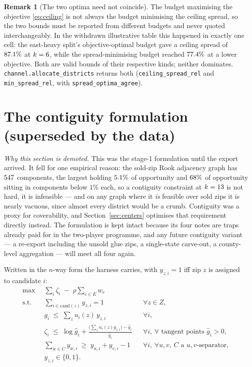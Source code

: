 \documentclass[11pt]{article}
\theoremstyle{definition}
\newtheorem{remark}{Remark}
\begin{document}
\begin{remark}[The two optima need not coincide]\label{rem:budget}
The budget maximising the objective \eqref{eq:ceiling} is not always the budget minimising
the ceiling spread, so the two bounds must be reported from different budgets and never
quoted interchangeably. In the withdrawn illustrative table this happened in exactly one
cell: the east-heavy split's objective-optimal budget gave a ceiling spread of
$87.1\%$ at $k=6$, while the spread-minimising budget reached
$77.4\%$ at a lower objective. Both are valid bounds of their respective
kinds; neither dominates. \texttt{channel.allocate\_districts} returns both
(\texttt{ceiling\_spread\_rel} and \texttt{min\_spread\_rel}, with
\texttt{spread\_optima\_agree}).
\end{remark}

\section{The contiguity formulation (superseded by the data)}\label{sec:formulation}

\emph{Why this section is demoted.} This was the stage-1 formulation until the export
arrived. It fell for one empirical reason: the sold-zip Rook adjacency graph has
$547$ components, the largest holding $5.1\%$ of opportunity
and $68\%$ of opportunity sitting in components below $1\%$ each, so a contiguity
constraint at $k=13$ is not hard, it is infeasible --- and on any graph where it
\emph{is} feasible over sold zips it is nearly vacuous, since almost every district would be
a crumb. Contiguity was a proxy for coverability, and Section~\ref{sec:centers} optimises
that requirement directly instead. The formulation is kept intact because its four notes are
traps already paid for in the two-player programme, and any future contiguity variant --- a
re-export including the unsold glue zips, a single-state carve-out, a county-level
aggregation --- will meet all four again.

Written in the $n$-way form the harness carries, with $y_{z,i}=1$ iff zip $z$ is
assigned to candidate $i$:
\begin{equation}\label{eq:milp}
\begin{aligned}
\max\;\; & \sum_i \zeta_i \;-\; \rho \sum_{e\in E} w_e\\
\text{s.t.}\;\;
& \sum_{i\in\mathrm{cand}(z)} y_{z,i} = 1 && \forall z\in Z,\\
& g_i \;\le\; \sum_z u_i(z)\, y_{z,i} && \forall i,\\
& \zeta_i \;\le\; \log \hat g_i + \frac{\bigl(\sum_z u_i(z) y_{z,i}\bigr)-\hat g_i}{\hat g_i}
   && \forall i,\ \forall \text{ tangent points } \hat g_i>0,\\
& \sum_{w\in C} y_{w,i} \;\ge\; y_{u,i} + y_{v,i} - 1
   && \forall i,\ \forall u,v,\ C \text{ a } u,v\text{-separator},\\
& y_{z,i}\in\{0,1\}.
\end{aligned}
\end{equation}
\end{document}
